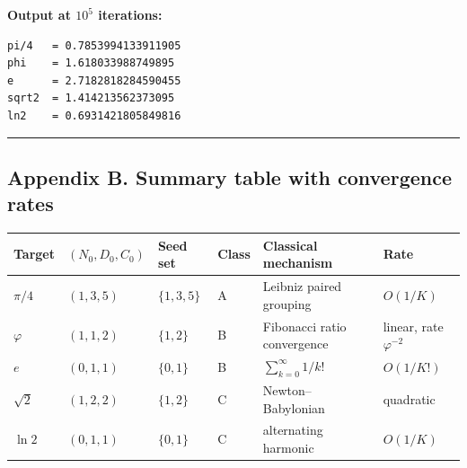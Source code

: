 \documentclass[12pt]{article}
\begin{document}
\textbf{Output at \(10^5\) iterations:}

\begin{verbatim}
pi/4   = 0.7853994133911905
phi    = 1.618033988749895
e      = 2.7182818284590455
sqrt2  = 1.414213562373095
ln2    = 0.6931421805849816
\end{verbatim}

\begin{center}\rule{0.5\linewidth}{0.5pt}\end{center}

\subsection{Appendix B. Summary table with convergence
rates}\label{appendix-b.-summary-table-with-convergence-rates}

\begin{longtable}[]{@{}
  >{\raggedright\arraybackslash}p{}
  >{\raggedright\arraybackslash}p{}
  >{\raggedright\arraybackslash}p{}
  >{\raggedright\arraybackslash}p{}
  >{\raggedright\arraybackslash}p{}
  >{\raggedright\arraybackslash}p{}@{}}
\toprule\noalign{}
\begin{minipage}[b]{\linewidth}\raggedright
Target
\end{minipage} & \begin{minipage}[b]{\linewidth}\raggedright
\((N_0,D_0,C_0)\)
\end{minipage} & \begin{minipage}[b]{\linewidth}\raggedright
Seed set
\end{minipage} & \begin{minipage}[b]{\linewidth}\raggedright
Class
\end{minipage} & \begin{minipage}[b]{\linewidth}\raggedright
Classical mechanism
\end{minipage} & \begin{minipage}[b]{\linewidth}\raggedright
Rate
\end{minipage} \\
\midrule\noalign{}
\endhead
\bottomrule\noalign{}
\endlastfoot
\(\pi/4\) & \((1,3,5)\) & \(\{1,3,5\}\) & A & Leibniz paired grouping &
\(O(1/K)\) \\
\(\varphi\) & \((1,1,2)\) & \(\{1,2\}\) & B & Fibonacci ratio
convergence & linear, rate \(\varphi^{-2}\) \\
\(e\) & \((0,1,1)\) & \(\{0,1\}\) & B & \(\sum_{k=0}^\infty 1/k!\) &
\(O(1/K!)\) \\
\(\sqrt{2}\) & \((1,2,2)\) & \(\{1,2\}\) & C & Newton--Babylonian &
quadratic \\
\(\ln 2\) & \((0,1,1)\) & \(\{0,1\}\) & C & alternating harmonic &
\(O(1/K)\) \\
\end{longtable}
\end{document}
